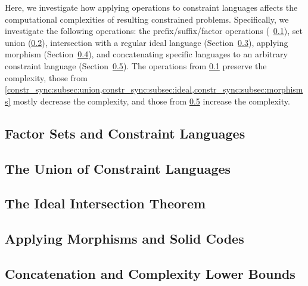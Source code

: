 
Here, we investigate how 
applying operations to 
constraint languages
affects the computational complexities of resulting constrained problems. Specifically, we investigate the following operations: 
the prefix/suffix/factor operations (\SEC~\ref{constr_sync:subsec:factor}),
set union (\cref{constr_sync:subsec:union}),
intersection with a regular
ideal language (Section~\ref{constr_sync:subsec:ideal}), applying morphism (Section~\ref{constr_sync:subsec:morphisms}),
and concatenating specific languages to an arbitrary constraint language (Section~\ref{constr_sync:subsec:concat}).
The operations from \cref{constr_sync:subsec:factor} 
preserve the complexity,
those from \cref{constr_sync:subsec:union,constr_sync:subsec:ideal,constr_sync:subsec:morphisms}
mostly decrease the complexity,
and those from \cref{constr_sync:subsec:concat}
increase the complexity.

\subsection{Factor Sets and Constraint Languages}
\label{constr_sync:subsec:factor}



\subsection{The Union of Constraint Languages}
\label{constr_sync:subsec:union}



\subsection{The Ideal Intersection Theorem}
\label{constr_sync:subsec:ideal}



\subsection{Applying Morphisms and Solid Codes}
\label{constr_sync:subsec:morphisms}



\subsection{Concatenation and Complexity Lower Bounds}
\label{constr_sync:subsec:concat}


